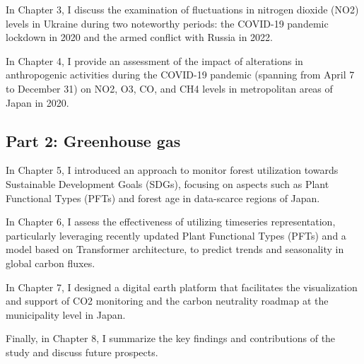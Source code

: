 In Chapter 3, I discuss the examination of fluctuations in nitrogen dioxide (NO2) levels in Ukraine during two noteworthy periods: the COVID-19 pandemic lockdown in 2020 and the armed conflict with Russia in 2022.\par

In Chapter 4, I provide an assessment of the impact of alterations in anthropogenic activities during the COVID-19 pandemic (spanning from April 7 to December 31) on NO2, O3, CO, and CH4 levels in metropolitan areas of Japan in 2020. \par
\subsection*{Part 2: Greenhouse gas}
In Chapter 5, I introduced an approach to monitor forest utilization towards Sustainable Development Goals (SDGs), focusing on aspects such as Plant Functional Types (PFTs) and forest age in data-scarce regions of Japan. \par

In Chapter 6, I assess the effectiveness of utilizing timeseries representation, particularly leveraging recently updated Plant Functional Types (PFTs) and a model based on Transformer architecture, to predict trends and seasonality in global carbon fluxes. \par

In Chapter 7, I designed a digital earth platform that facilitates the visualization and support of CO2 monitoring and the carbon neutrality roadmap at the municipality level in Japan. \par

Finally, in Chapter 8, I summarize the key findings and contributions of the study and discuss future prospects.\par